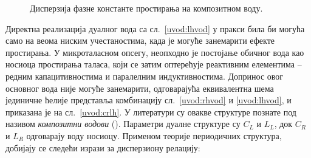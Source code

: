 \begin{figure}[h]
    \centering
    \hfill
    \caption{Дисперзија фазне константе простирања на композитном воду.}
\end{figure}
Директна реализација дуалног вода са сл.~\ref{uvod:lhvod} у пракси била би могућа само на веома ниским учестаностима, када је могуће занемарити ефекте простирања. У микроталасном опсегу, неопходно је постојање обичног вода као носиоца простирања таласа, који се затим оптерећује реактивним елементима -- редним капацитивностима и паралелним индуктивностима. Допринос овог основног вода није могуће занемарити, одговарајућа еквивалентна шема јединичне ћелије представља комбинацију сл.~\ref{uvod:rhvod} и \ref{uvod:lhvod}, и приказана је на сл.~\ref{uvod:crlh}. У литератури су овакве структуре познате под називом \emph{композитни водови} (). Параметри дуалне структуре су $C_L$ и $L_L$, док $C_R$ и $L_R$ одговарају воду носиоцу. Применом теорије периодичних структура, добијају се следећи изрази за дисперзиону релацију:
